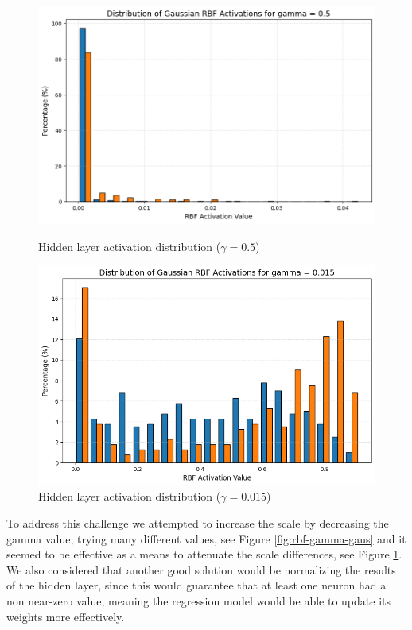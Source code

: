 \documentclass[11pt]{article}
\begin{document}
\begin{figure}[H]
  \centering
  \begin{minipage}{0.48\textwidth}
      \includegraphics[width=\linewidth]{img/RBF_Activation_500.png}
      \caption{Hidden layer activation distribution ($\gamma=0.5$)}
      \label{fig:rbf-dist-big}
  \end{minipage}
  \hfill
  \begin{minipage}{0.48\textwidth}
      \includegraphics[width=\linewidth]{img/RBF_Activation_15.png}
      \caption{Hidden layer activation distribution ($\gamma=0.015$)}
      \label{fig:rbf-dist-small}
  \end{minipage}
\end{figure}

To address this challenge we attempted to increase the scale by decreasing the
gamma value, trying many different values, see Figure \ref{fig:rbf-gamma-gaus}
and it seemed to be effective as a means to attenuate the scale
differences, see Figure \ref{fig:rbf-dist-small}. We also considered that
another good solution would be normalizing the results of the hidden layer,
since this would guarantee that at least one neuron had a non near-zero value,
meaning the regression model would be able to update its weights more
effectively.
\end{document}
